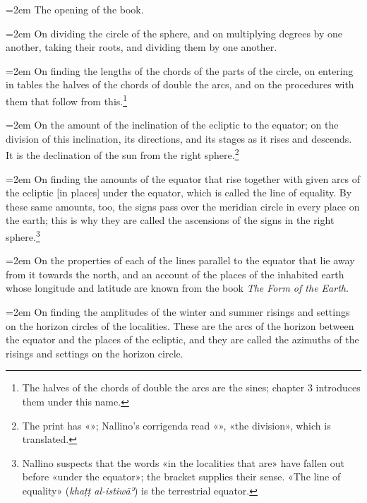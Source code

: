 \documentclass[11pt]{article}
\newcommand{\ArPage}[1]{\marginpar{\footnotesize\color{gray}Ar.\,p.\,#1}}
\begin{document}
\par\noindent\hangindent=2em The opening of the book.\par
\par\noindent\hangindent=2em On dividing the circle of the sphere, and on multiplying degrees by one another, taking their roots, and dividing them by one another.\par
\par\noindent\hangindent=2em On finding the lengths of the chords of the parts of the circle, on entering in tables the halves of the chords of double the arcs, and on the procedures with them that follow from this.\footnote{The halves of the chords of double the arcs are the sines; chapter 3 introduces them under this name.}\par
\par\noindent\hangindent=2em On the amount of the inclination of the ecliptic to the equator; on the division of this inclination, its directions, and its stages as it rises and descends. It is the declination of the sun from the right sphere.\footnote{The print has «»; Nallino's corrigenda read «», «the division», which is translated.}\par
\par\noindent\hangindent=2em On finding the amounts of the equator that rise together with given arcs of the ecliptic [in places] under the equator, which is called the line of equality. By these same amounts, too, the signs pass over the meridian circle in every place on the earth; this is why they are called the ascensions of the signs in the right sphere.\footnote{Nallino suspects that the words «in the localities that are» have fallen out before «under the equator»; the bracket supplies their sense. «The line of equality» (\emph{khaṭṭ al-istiwāʾ}) is the terrestrial equator.}\par
\par\noindent\hangindent=2em \ArPage{2}On the properties of each of the lines parallel to the equator that lie away from it towards the north, and an account of the places of the inhabited earth whose longitude and latitude are known from the book \emph{The Form of the Earth}.\par
\par\noindent\hangindent=2em On finding the amplitudes of the winter and summer risings and settings on the horizon circles of the localities. These are the arcs of the horizon between the equator and the places of the ecliptic, and they are called the azimuths of the risings and settings on the horizon circle.\par
\end{document}
